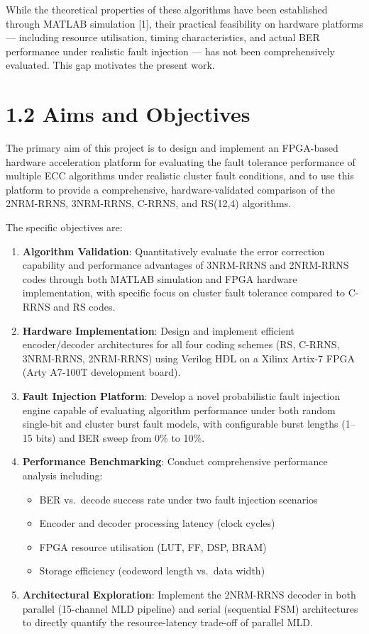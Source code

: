 \documentclass[
  12pt,
  a4paper]{report}
\providecommand{\tightlist}{%
  \setlength{\itemsep}{0pt}\setlength{\parskip}{0pt}}
\begin{document}
While the theoretical properties of these algorithms have been
established through MATLAB simulation {[}1{]}, their practical
feasibility on hardware platforms --- including resource utilisation,
timing characteristics, and actual BER performance under realistic fault
injection --- has not been comprehensively evaluated. This gap motivates
the present work.

\section{1.2 Aims and Objectives}\label{aims-and-objectives}

The primary aim of this project is to design and implement an FPGA-based
hardware acceleration platform for evaluating the fault tolerance
performance of multiple ECC algorithms under realistic cluster fault
conditions, and to use this platform to provide a comprehensive,
hardware-validated comparison of the 2NRM-RRNS, 3NRM-RRNS, C-RRNS, and
RS(12,4) algorithms.

The specific objectives are:

\begin{enumerate}
\def\labelenumi{\arabic{enumi}.}
\tightlist
\item
  \textbf{Algorithm Validation}: Quantitatively evaluate the error
  correction capability and performance advantages of 3NRM-RRNS and
  2NRM-RRNS codes through both MATLAB simulation and FPGA hardware
  implementation, with specific focus on cluster fault tolerance
  compared to C-RRNS and RS codes.
\item
  \textbf{Hardware Implementation}: Design and implement efficient
  encoder/decoder architectures for all four coding schemes (RS, C-RRNS,
  3NRM-RRNS, 2NRM-RRNS) using Verilog HDL on a Xilinx Artix-7 FPGA (Arty
  A7-100T development board).
\item
  \textbf{Fault Injection Platform}: Develop a novel probabilistic fault
  injection engine capable of evaluating algorithm performance under
  both random single-bit and cluster burst fault models, with
  configurable burst lengths (1--15 bits) and BER sweep from 0\% to
  10\%.
\item
  \textbf{Performance Benchmarking}: Conduct comprehensive performance
  analysis including:

  \begin{itemize}
  \tightlist
  \item
    BER vs.~decode success rate under two fault injection scenarios
  \item
    Encoder and decoder processing latency (clock cycles)
  \item
    FPGA resource utilisation (LUT, FF, DSP, BRAM)
  \item
    Storage efficiency (codeword length vs.~data width)
  \end{itemize}
\item
  \textbf{Architectural Exploration}: Implement the 2NRM-RRNS decoder in
  both parallel (15-channel MLD pipeline) and serial (sequential FSM)
  architectures to directly quantify the resource-latency trade-off of
  parallel MLD.
\end{enumerate}
\end{document}
